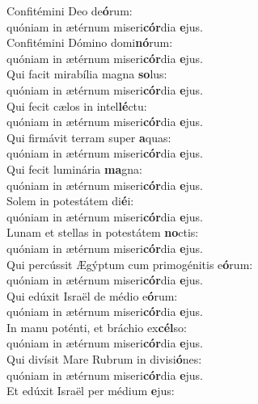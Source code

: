 \evenverse Confitémini Deo de\textbf{ó}rum:~\*\\
\evenverse quóniam in ætérnum miseri\textbf{cór}dia \textbf{e}jus.\\
\oddverse Confitémini Dómino domi\textbf{nó}rum:~\*\\
\oddverse quóniam in ætérnum miseri\textbf{cór}dia \textbf{e}jus.\\
\evenverse Qui facit mirabília magna \textbf{so}lus:~\*\\
\evenverse quóniam in ætérnum miseri\textbf{cór}dia \textbf{e}jus.\\
\oddverse Qui fecit cælos in intel\textbf{lé}ctu:~\*\\
\oddverse quóniam in ætérnum miseri\textbf{cór}dia \textbf{e}jus.\\
\evenverse Qui firmávit terram super \textbf{a}quas:~\*\\
\evenverse quóniam in ætérnum miseri\textbf{cór}dia \textbf{e}jus.\\
\oddverse Qui fecit luminária \textbf{ma}gna:~\*\\
\oddverse quóniam in ætérnum miseri\textbf{cór}dia \textbf{e}jus.\\
\evenverse Solem in potestátem di\textbf{é}i:~\*\\
\evenverse quóniam in ætérnum miseri\textbf{cór}dia \textbf{e}jus.\\
\oddverse Lunam et stellas in potestátem \textbf{no}ctis:~\*\\
\oddverse quóniam in ætérnum miseri\textbf{cór}dia \textbf{e}jus.\\
\evenverse Qui percússit Ægýptum cum primogénitis e\textbf{ó}rum:~\*\\
\evenverse quóniam in ætérnum miseri\textbf{cór}dia \textbf{e}jus.\\
\oddverse Qui edúxit Israël de médio e\textbf{ó}rum:~\*\\
\oddverse quóniam in ætérnum miseri\textbf{cór}dia \textbf{e}jus.\\
\evenverse In manu poténti, et bráchio ex\textbf{cél}so:~\*\\
\evenverse quóniam in ætérnum miseri\textbf{cór}dia \textbf{e}jus.\\
\oddverse Qui divísit Mare Rubrum in divisi\textbf{ó}nes:~\*\\
\oddverse quóniam in ætérnum miseri\textbf{cór}dia \textbf{e}jus.\\
\evenverse Et edúxit Israël per médium \textbf{e}jus:~\*\\
